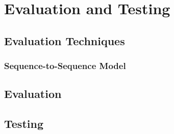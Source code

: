 \section{Evaluation and Testing}

\subsection{Evaluation Techniques}

\subsubsection{Sequence-to-Sequence Model}

\subsection{Evaluation}



\subsection{Testing}
